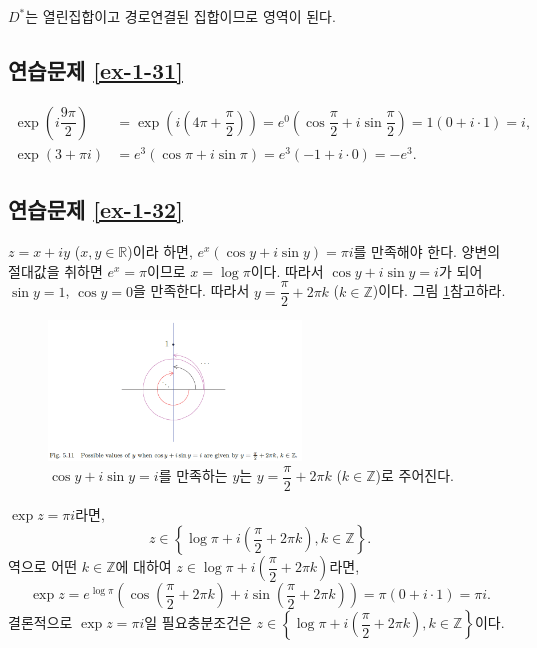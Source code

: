 $D^*$는 열린집합이고 경로연결된 집합이므로 영역이 된다.

\subsection*{연습문제 \ref{ex-1-31}}

\begin{align*}
\exp\left(i\dfrac{9\pi}2\right) 
&= \exp\left(i\left(4\pi + \dfrac{\pi}2\right) \right)
= e^0 \left( \cos\dfrac\pi2 + i\sin\dfrac\pi2 \right) 
= 1(0+i\cdot 1) = i, \\
\exp(3+\pi i) &= e^3(\cos \pi + i\sin \pi) = e^3(-1+i\cdot 0) = -e^3.
\end{align*}

\subsection*{연습문제 \ref{ex-1-32}}

$z=x+iy$ ($x,y\in\mathbb R$)이라 하면,
$e^x(\cos y + i\sin y) = \pi i$를 만족해야 한다.
양변의 절대값을 취하면 $e^x = \pi$이므로
$x=\log \pi$이다.
따라서 $\cos y + i\sin y = i$가 되어
$\sin y = 1$, $\cos y=0$을 만족한다.
따라서 $y = \dfrac\pi2 + 2\pi k$ ($k\in \mathbb Z$)이다.
그림 \ref{fig-5-11}\을 참고하라.

\begin{figure}[h!]
\begin{center}
\includegraphics[width=0.6\textwidth]{./figs/fig-5-11}
\end{center}
\caption{$\cos y + i\sin y = i$를 만족하는 $y$는
$y = \dfrac\pi2 + 2\pi k$ ($k\in \mathbb Z$)로 주어진다.
}
\label{fig-5-11}
\end{figure}

$\exp z = \pi i$라면,
\[
z\in \left\{ \log \pi + i \left(\dfrac\pi 2 + 2\pi k\right), k\in\mathbb Z\right\}.
\]
역으로 어떤 $k\in\mathbb Z$에 대하여
$z\in \log \pi + i \left(\dfrac\pi 2 + 2\pi k\right)$라면,
\[
\exp z = e^{\log \pi} \left(
\cos\left(\dfrac\pi2+2\pi k\right) + i \sin\left(\dfrac\pi2+2\pi k\right)
\right) = \pi(0+i\cdot 1) = \pi i.
\]
결론적으로 $\exp z = \pi i$일 필요충분조건은
$z\in \left\{ \log \pi + i \left(\dfrac\pi 2 + 2\pi k\right), k\in\mathbb Z\right\}$이다.

